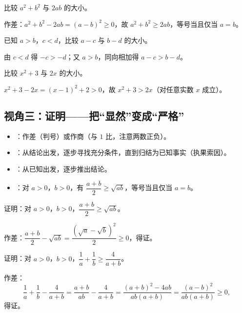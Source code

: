 \begin{explore}
\begin{example}
比较 $a^2+b^2$ 与 $2ab$ 的大小。
\end{example}
\begin{solution}
作差：$a^2+b^2-2ab=(a-b)^2\geq0$，故 $a^2+b^2\geq2ab$，等号当且仅当 $a=b$。
\end{solution}

\begin{problem}
已知 $a>b$，$c<d$，比较 $a-c$ 与 $b-d$ 的大小。
\end{problem}
\begin{solution}
由 $c<d$ 得 $-c>-d$；又 $a>b$，同向相加得 $a-c>b-d$。
\end{solution}

\begin{problem}
比较 $x^2+3$ 与 $2x$ 的大小。
\end{problem}
\begin{solution}
$x^2+3-2x=(x-1)^2+2>0$，故 $x^2+3>2x$（对任意实数 $x$ 成立）。
\end{solution}

\subsection{视角三：证明——把“显然”变成“严格”}

\begin{itemize}
  \item {}：作差（判号）或作商（与 $1$ 比，注意两数正负）。
  \item {}：从结论出发，逐步寻找充分条件，直到归结为已知事实（执果索因）。
  \item {}：从已知出发，逐步推出结论。
  \item {}：对 $a>0$，$b>0$，有 $\dfrac{a+b}{2}\geq\sqrt{ab}$，等号当且仅当 $a=b$。
\end{itemize}

\begin{example}
证明：对 $a>0$，$b>0$，$\dfrac{a+b}{2}\geq\sqrt{ab}$。
\end{example}
\begin{solution}
作差：$\dfrac{a+b}{2}-\sqrt{ab}=\dfrac{(\sqrt a-\sqrt b)^2}{2}\geq0$，得证。
\end{solution}

\begin{example}
证明：对 $a>0$，$b>0$，$\dfrac{1}{a}+\dfrac{1}{b}\geq\dfrac{4}{a+b}$。
\end{example}
\begin{solution}
作差：
\[
  \frac1a+\frac1b-\frac{4}{a+b}
  =\frac{a+b}{ab}-\frac{4}{a+b}
  =\frac{(a+b)^2-4ab}{ab(a+b)}
  =\frac{(a-b)^2}{ab(a+b)}\geq0,
\]
得证。
\end{solution}


\end{explore}
